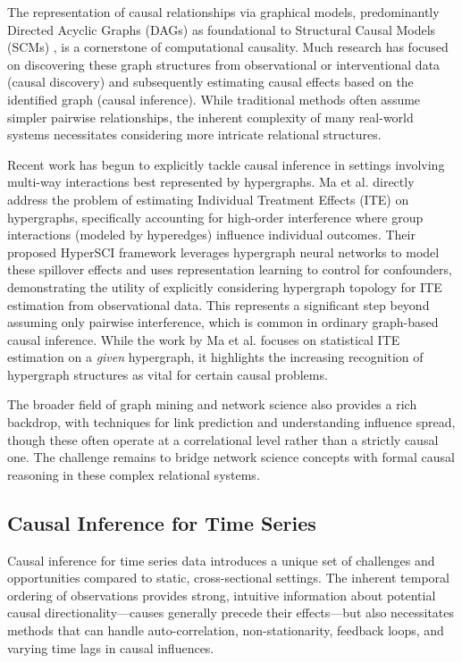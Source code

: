 {The representation of causal relationships via graphical models, predominantly Directed Acyclic Graphs (DAGs) as foundational to Structural Causal Models (SCMs) \cite{Pearl2009Causality}, is a cornerstone of computational causality. Much research has focused on discovering these graph structures from observational or interventional data (causal discovery) and subsequently estimating causal effects based on the identified graph (causal inference). While traditional methods often assume simpler pairwise relationships, the inherent complexity of many real-world systems necessitates considering more intricate relational structures.

Recent work has begun to explicitly tackle causal inference in settings involving multi-way interactions best represented by hypergraphs. Ma et al. \cite{ma2022learning} directly address the problem of estimating Individual Treatment Effects (ITE) on hypergraphs, specifically accounting for high-order interference where group interactions (modeled by hyperedges) influence individual outcomes. Their proposed HyperSCI framework leverages hypergraph neural networks to model these spillover effects and uses representation learning to control for confounders, demonstrating the utility of explicitly considering hypergraph topology for ITE estimation from observational data. This represents a significant step beyond assuming only pairwise interference, which is common in ordinary graph-based causal inference. While the work by Ma et al. focuses on statistical ITE estimation on a \textit{given} hypergraph, it highlights the increasing recognition of hypergraph structures as vital for certain causal problems.

The broader field of graph mining and network science also provides a rich backdrop, with techniques for link prediction and understanding influence spread, though these often operate at a correlational level rather than a strictly causal one. The challenge remains to bridge network science concepts with formal causal reasoning in these complex relational systems.


\subsection{Causal Inference for Time Series}
\label{subsec:causal_timeseries}

Causal inference for time series data introduces a unique set of challenges and opportunities compared to static, cross-sectional settings. The inherent temporal ordering of observations provides strong, intuitive information about potential causal directionality---causes generally precede their effects---but also necessitates methods that can handle auto-correlation, non-stationarity, feedback loops, and varying time lags in causal influences.

}
